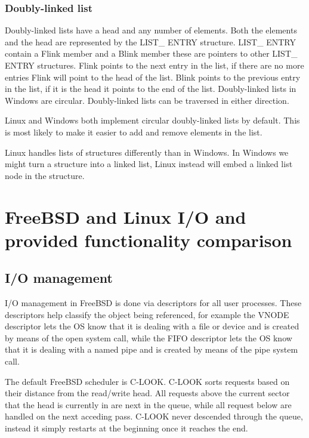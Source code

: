 \documentclass[letterpaper, 10pt, onecolumn, draftclsnofoot]{IEEEtran}
\begin{document}
\subsubsection{Doubly-linked list}
Doubly-linked lists have a head and any number of elements.
Both the elements and the head are represented by the LIST\_ ENTRY structure. LIST\_ ENTRY contain a Flink member and a Blink member these are pointers to other LIST\_ ENTRY structures. Flink points to the next entry in the list, if there are no more entries Flink will point to the head of the list. Blink points to the previous entry in the list, if it is the head it points to the end of the list. Doubly-linked lists in Windows are circular. Doubly-linked lists can be traversed in either direction.\cite{windows-driver-content}

Linux and Windows both implement circular doubly-linked lists by default. This is most likely to make it easier to add and remove elements in the list.\cite{linux}

Linux handles lists of structures differently than in Windows. In Windows we might turn a structure into a linked list, Linux instead will embed a linked list node in the structure.\cite{linux}

\section{FreeBSD and Linux I/O and provided functionality comparison}

\subsection{I/O management}
I/O management in FreeBSD is done via descriptors for all user  processes. These descriptors help classify the object being referenced, for example the VNODE descriptor lets the OS know that it is dealing with a file or device and is created by means of the open system call, while the FIFO descriptor lets the OS know that it is dealing with a named pipe and is created by means of the pipe system call.\cite{BSD}

The default FreeBSD scheduler is C-LOOK. C-LOOK sorts requests based on their distance from the read/write head. All requests above the current sector that the head is currently in are next in the queue, while all request below are handled on the next acceding pass. C-LOOK never descended through the queue, instead it simply restarts at the beginning once it reaches the end.\cite{BSD_hybrid}
\end{document}
